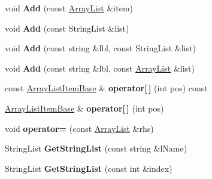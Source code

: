 \begin{DoxyCompactItemize}
\item 
\hypertarget{classrrc_1_1_array_list_a7cc58eadb8c787d0224acd49249d619b}{void {\bfseries Add} (const \hyperlink{classrrc_1_1_array_list}{Array\-List} \&item)}\label{classrrc_1_1_array_list_a7cc58eadb8c787d0224acd49249d619b}

\item 
\hypertarget{classrrc_1_1_array_list_ab74dfcee4c99721f851ed47328d84efc}{void {\bfseries Add} (const String\-List \&list)}\label{classrrc_1_1_array_list_ab74dfcee4c99721f851ed47328d84efc}

\item 
\hypertarget{classrrc_1_1_array_list_a0e26c53f3abed565e238ad8f98e0e8f9}{void {\bfseries Add} (const string \&lbl, const String\-List \&list)}\label{classrrc_1_1_array_list_a0e26c53f3abed565e238ad8f98e0e8f9}

\item 
\hypertarget{classrrc_1_1_array_list_aa1f0a238547dcf0f247d3347ca3cb21f}{void {\bfseries Add} (const string \&lbl, const \hyperlink{classrrc_1_1_array_list}{Array\-List} \&list)}\label{classrrc_1_1_array_list_aa1f0a238547dcf0f247d3347ca3cb21f}

\item 
\hypertarget{classrrc_1_1_array_list_aa6ac18b04a68561b7296e296619585bc}{const \hyperlink{classrrc_1_1_array_list_item_base}{Array\-List\-Item\-Base} \& {\bfseries operator\mbox{[}$\,$\mbox{]}} (int pos) const }\label{classrrc_1_1_array_list_aa6ac18b04a68561b7296e296619585bc}

\item 
\hypertarget{classrrc_1_1_array_list_a7a01b2f7aa0665a584baaed7e966e58e}{\hyperlink{classrrc_1_1_array_list_item_base}{Array\-List\-Item\-Base} \& {\bfseries operator\mbox{[}$\,$\mbox{]}} (int pos)}\label{classrrc_1_1_array_list_a7a01b2f7aa0665a584baaed7e966e58e}

\item 
\hypertarget{classrrc_1_1_array_list_a2fa1b9e67926c5a462650a27b3ff054b}{void {\bfseries operator=} (const \hyperlink{classrrc_1_1_array_list}{Array\-List} \&rhs)}\label{classrrc_1_1_array_list_a2fa1b9e67926c5a462650a27b3ff054b}

\item 
\hypertarget{classrrc_1_1_array_list_a88f413f85d878aa501cfa0d9393af83d}{String\-List {\bfseries Get\-String\-List} (const string \&l\-Name)}\label{classrrc_1_1_array_list_a88f413f85d878aa501cfa0d9393af83d}

\item 
\hypertarget{classrrc_1_1_array_list_a0d713d8ec0ca7a64280381f7cf4f5519}{String\-List {\bfseries Get\-String\-List} (const int \&index)}\label{classrrc_1_1_array_list_a0d713d8ec0ca7a64280381f7cf4f5519}


\end{DoxyCompactItemize}

